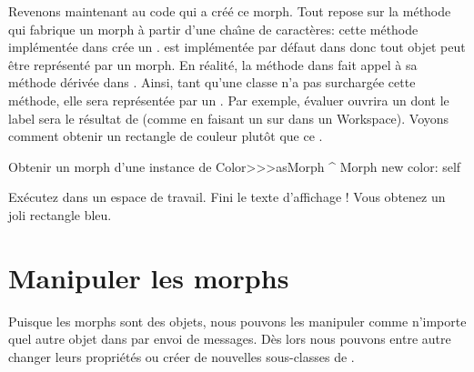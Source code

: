 \documentclass[a4paper,10pt,twoside]{book}
\begin{document}
Revenons maintenant au code qui a cr\'e\'e ce morph.%
Tout repose sur la m\'ethode qui fabrique un morph \`a partir d'une
cha\^{\i}ne de caract\`eres:
cette m\'ethode  impl\'ement\'ee dans
 cr\'ee un .  est
impl\'ement\'ee par d\'efaut dans  donc tout objet peut
\^etre repr\'esent\'e par un morph. En r\'ealit\'e, la m\'ethode
 dans  fait appel \`a sa m\'ethode d\'eriv\'ee
dans . Ainsi, tant qu'une classe n'a pas surcharg\'ee cette
m\'ethode, elle sera repr\'esent\'ee par un .
Par exemple, \'evaluer  ouvrira un
 dont le label sera le r\'esultat de 
 (comme en faisant un  sur 
dans un Workspace).
Voyons comment obtenir un rectangle de couleur plut\^ot que ce
.

\begin{method}{Obtenir un morph d'une instance de }
Color>>>asMorph
	^ Morph new color: self
\end{method}
\noindent
Ex\'ecutez   dans un
espace de travail. Fini le texte d'affichage ! Vous
obtenez un joli rectangle bleu.


\section{Manipuler les morphs}

Puisque les morphs sont des objets, nous pouvons les manipuler comme
n'importe quel autre objet dans \st \cad par envoi de messages. D\`es
lors nous pouvons entre autre changer leurs propri\'et\'es ou cr\'eer
de nouvelles sous-classes de .
\end{document}
